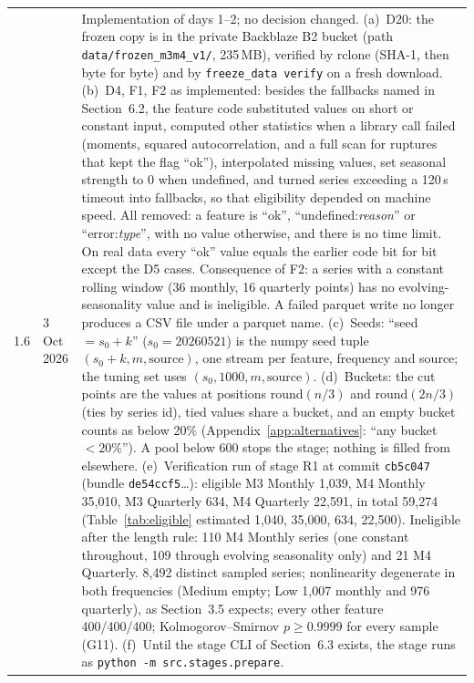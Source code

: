\documentclass[11pt,a4paper]{article}
\newcommand{\code}[1]{\texttt{#1}}
\begin{document}
\begin{longtable}{@{}p{1.3cm} p{1.9cm} p{11.8cm}@{}}
1.6 & 3 Oct 2026 & Implementation of days 1--2; no decision changed. (a)~D20: the frozen copy is in the private Backblaze B2 bucket (path \mbox{\code{data/frozen_m3m4_v1/}}, 235\,MB), verified by rclone (SHA-1, then byte for byte) and by \code{freeze_data verify} on a fresh download. (b)~D4, F1, F2 as implemented: besides the fallbacks named in Section~6.2, the feature code substituted values on short or constant input, computed other statistics when a library call failed (moments, squared autocorrelation, and a full scan for ruptures that kept the flag ``ok''), interpolated missing values, set seasonal strength to 0 when undefined, and turned series exceeding a 120\,s timeout into fallbacks, so that eligibility depended on machine speed. All removed: a feature is ``ok'', ``undefined:\emph{reason}'' or ``error:\emph{type}'', with no value otherwise, and there is no time limit. On real data every ``ok'' value equals the earlier code bit for bit except the D5 cases. Consequence of F2: a series with a constant rolling window (36 monthly, 16 quarterly points) has no evolving-seasonality value and is ineligible. A failed parquet write no longer produces a CSV file under a parquet name. (c)~Seeds: ``seed $= s_0 + k$'' ($s_0 = 20260521$) is the numpy seed tuple $(s_0 + k, m, \text{source})$, one stream per feature, frequency and source; the tuning set uses $(s_0, 1000, m, \text{source})$. (d)~Buckets: the cut points are the values at positions round$(n/3)$ and round$(2n/3)$ (ties by series id), tied values share a bucket, and an empty bucket counts as below 20\% (Appendix~\ref{app:alternatives}: ``any bucket $< 20\%$''). A pool below 600 stops the stage; nothing is filled from elsewhere. (e)~Verification run of stage R1 at commit \code{cb5c047} (bundle \code{de54ccf5}\dots): eligible M3 Monthly 1,039, M4 Monthly 35,010, M3 Quarterly 634, M4 Quarterly 22,591, in total 59,274 (Table~\ref{tab:eligible} estimated 1,040, 35,000, 634, 22,500). Ineligible after the length rule: 110 M4 Monthly series (one constant throughout, 109 through evolving seasonality only) and 21 M4 Quarterly. 8,492 distinct sampled series; nonlinearity degenerate in both frequencies (Medium empty; Low 1,007 monthly and 976 quarterly), as Section~3.5 expects; every other feature 400/400/400; Kolmogorov--Smirnov $p \geq 0.9999$ for every sample (G11). (f)~Until the stage CLI of Section~6.3 exists, the stage runs as \code{python -m src.stages.prepare}. \\

\end{longtable}
\end{document}
